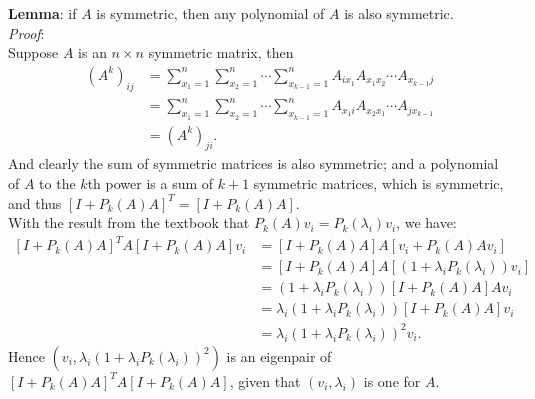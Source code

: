 \documentclass[11pt]{article}
\begin{document}
\section{}
\textbf{Lemma}: if $A$ is symmetric, then any polynomial of $A$ is also symmetric.\\[0.4cm]
\textit{Proof}: \\[0.3cm]
Suppose $A$ is an $n\times n$ symmetric matrix, then
\begin{equation}\begin{split}
(A^k)_{ij} &=\sum_{x_1=1}^n \sum_{x_2=1}^n\cdots\sum_{x_{k-1}=1}^nA_{ix_1}A_{x_1x_2}\cdots A_{x_{k-1}j}\\
&=\sum_{x_1=1}^n \sum_{x_2=1}^n\cdots\sum_{x_{k-1}=1}^nA_{x_1i}A_{x_2x_1}\cdots A_{jx_{k-1}}\\
&=(A^k)_{ji}.
\end{split}\nonumber\end{equation} 
And clearly the sum of symmetric matrices is also symmetric; and a polynomial of $A$ to the $k$th power is a sum of $k+1$ symmetric matrices, which is symmetric, and thus $[I+P_k(A)A]^T = [I + P_k(A)A].$\\[0,4cm]
With the result from the textbook that $P_k(A)v_i=P_k(\lambda_i)v_i$, we have:
\begin{equation}\begin{split} 
[I+P_k(A)A]^TA[I+P_k(A)A]v_i &= [I+P_k(A)A]A[v_i+P_k(A)Av_i]\\
&=[I+P_k(A)A]A[(1+\lambda_iP_k(\lambda_i))v_i] \\
&=(1+\lambda_iP_k(\lambda_i))[I+P_k(A)A]Av_i \\
&=\lambda_i(1+\lambda_iP_k(\lambda_i))[I+P_k(A)A]v_i\\
&=\lambda_i(1+\lambda_iP_k(\lambda_i))^2v_i.
\end{split}\nonumber\end{equation} 
Hence $(v_i,\lambda_i(1+\lambda_iP_k(\lambda_i))^2)$ is an eigenpair of $[I+P_k(A)A]^TA[I+P_k(A)A]$, given that $(v_i,\lambda_i)$ is one for $A$.
\end{document}
